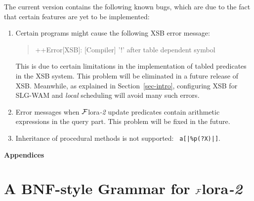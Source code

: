 \documentclass[11pt]{article}
\newcommand{\FLSYSTEM}{{\mbox{\sc ${\cal F}${lora}\rm\emph{-2}}}\xspace}
\begin{document}
The current version contains the following known bugs, which are due to the
fact that certain features are yet to be implemented:
\begin{enumerate}
  \item  Certain programs might cause the following XSB error message:
    \begin{quote}
     ++Error[XSB]: [Compiler] '!' after table dependent symbol 
    \end{quote}
    This is due to certain limitations in the implementation of tabled
    predicates in the XSB system. This problem will be eliminated in a
    future release of XSB. Meanwhile, as explained in
    Section~\ref{sec-intro},
    configuring XSB for SLG-WAM and \emph{local} scheduling will avoid many
    such errors.
  \item Error messages when \FLSYSTEM update predicates contain arithmetic
    expressions in the query part. This problem will be fixed in the
    future.
  \item Inheritance of procedural methods is not supported: {\tt
      a[|\%p(?X)|]}.
\end{enumerate}


\appendix

\newpage

\noindent
{\LARGE\bf Appendices}

\section{A BNF-style Grammar for \FLSYSTEM}\label{app-bnf}
\end{document}
